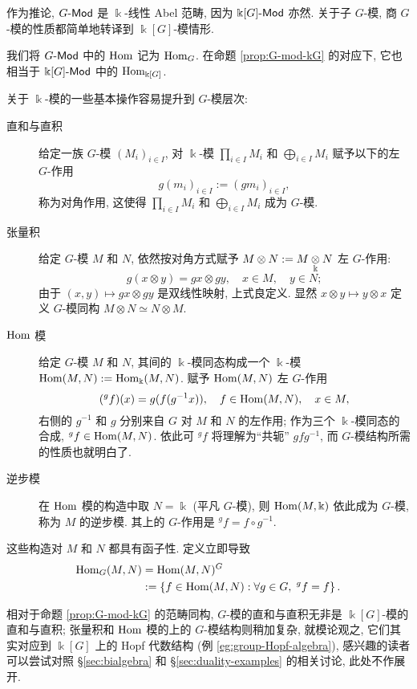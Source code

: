 作为推论, $G\text{-}\mathsf{Mod}$ 是 $\Bbbk$-线性 Abel 范畴, 因为 $\Bbbk[G]\text{-}\mathsf{Mod}$ 亦然. 关于子 $G$-模, 商 $G$-模的性质都简单地转译到 $\Bbbk[G]$-模情形.

\begin{definition}\label{def:HomG}
	我们将 $G\text{-}\mathsf{Mod}$ 中的 $\operatorname{Hom}$ 记为 $\operatorname{Hom}_G$. 在命题 \ref{prop:G-mod-kG} 的对应下, 它也相当于 $\Bbbk[G]\text{-}\mathsf{Mod}$ 中的 $\operatorname{Hom}_{\Bbbk[G]}$.
\end{definition}

关于 $\Bbbk$-模的一些基本操作容易提升到 $G$-模层次:
\begin{description}
	\item[直和与直积] 给定一族 $G$-模 $(M_i)_{i \in I}$, 对 $\Bbbk$-模 $\prod_{i \in I} M_i$ 和 $\bigoplus_{i \in I} M_i$ 赋予以下的左 $G$-作用
	\[ g (m_i)_{i \in I} := (gm_i)_{i \in I}, \]
	称为对角作用, 这使得 $\prod_{i \in I} M_i$ 和 $\bigoplus_{i \in I} M_i$ 成为 $G$-模.
	\item[张量积] 给定 $G$-模 $M$ 和 $N$, 依然按对角方式赋予 $M \otimes N := M \underset{\Bbbk}{\otimes} N$ 左 $G$-作用:
	\[ g (x \otimes y) = gx \otimes gy, \quad x \in M, \quad y \in N ; \]
	由于 $(x, y) \mapsto gx \otimes gy$ 是双线性映射, 上式良定义. 显然 $x \otimes y \mapsto y \otimes x$ 定义 $G$-模同构 $M \otimes N \simeq N \otimes M$.
	\item[$\operatorname{Hom}$ 模] 给定 $G$-模 $M$ 和 $N$, 其间的 $\Bbbk$-模同态构成一个 $\Bbbk$-模 $\operatorname{Hom}(M, N) := \operatorname{Hom}_{\Bbbk}(M, N)$. 赋予 $\operatorname{Hom}(M, N)$ 左 $G$-作用
	\[ ({}^g f)(x) = g(f(g^{-1} x)), \quad f \in \operatorname{Hom}(M, N), \quad x \in M, \]
	右侧的 $g^{-1}$ 和 $g$ 分别来自 $G$ 对 $M$ 和 $N$ 的左作用; 作为三个 $\Bbbk$-模同态的合成, ${}^g f \in \operatorname{Hom}(M, N)$. 依此可 ${}^g f$ 将理解为``共轭'' $gfg^{-1}$, 而 $G$-模结构所需的性质也就明白了.
	
	\item[逆步模] 在 $\operatorname{Hom}$ 模的构造中取 $N = \Bbbk$ (平凡 $G$-模), 则 $\operatorname{Hom}(M, \Bbbk)$ 依此成为 $G$-模, 称为 $M$ 的逆步模. 其上的 $G$-作用是 ${}^g f = f \circ g^{-1}$.
\end{description}

这些构造对 $M$ 和 $N$ 都具有函子性. 定义立即导致
\begin{align*}
	\operatorname{Hom}_G(M, N) & = \operatorname{Hom}(M, N)^G \\
	& := \left\{f \in \operatorname{Hom}(M, N): \forall g \in G, \; {}^g f = f \right\}.
\end{align*}

相对于命题 \ref{prop:G-mod-kG} 的范畴同构, $G$-模的直和与直积无非是 $\Bbbk[G]$-模的直和与直积; 张量积和 $\operatorname{Hom}$ 模的上的 $G$-模结构则稍加复杂, 就模论观之, 它们其实对应到 $\Bbbk[G]$ 上的 Hopf 代数结构 (例 \ref{eg:group-Hopf-algebra}), 感兴趣的读者可以尝试对照 \S\ref{sec:bialgebra} 和 \S\ref{sec:duality-examples} 的相关讨论, 此处不作展开.

